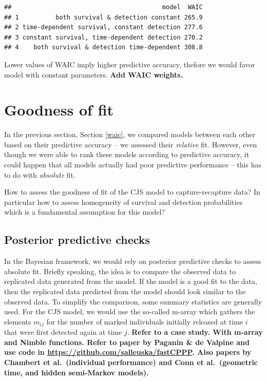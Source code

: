 \documentclass[
  12pt,
]{krantz}
\begin{document}
\begin{verbatim}
##                                         model  WAIC
## 1          both survival & detection constant 265.9
## 2 time-dependent survival, constant detection 277.6
## 3 constant survival, time-dependent detection 270.2
## 4    both survival & detection time-dependent 308.8
\end{verbatim}

Lower values of WAIC imply higher predictive accuracy, thefore we would favor model with constant parameters. \textbf{Add WAIC weights.}

\hypertarget{gof}{%
\section{Goodness of fit}\label{gof}}

In the previous section, Section \ref{waic}, we compared models between each other based on their predictive accuracy -- we assessed their \emph{relative} fit. However, even though we were able to rank these models according to predictive accuracy, it could happen that all models actually had poor predictive performance -- this has to do with \emph{absolute} fit.

How to assess the goodness of fit of the CJS model to capture-recapture data? In particular how to assess homogeneity of survival and detection probabilities which is a fundamental assumption for this model?

\hypertarget{posterior-predictive-checks}{%
\subsection{Posterior predictive checks}\label{posterior-predictive-checks}}

In the Bayesian framework, we would rely on posterior predictive checks to assess absolute fit. Briefly speaking, the idea is to compare the observed data to replicated data generated from the model. If the model is a good fit to the data, then the replicated data predicted from the model should look similar to the observed data. To simplify the comparison, some summary statistics are generally used. For the CJS model, we would use the so-called m-array which gathers the elements \(m_{ij}\) for the number of marked individuals initially released at time \(i\) that were first detected again at time \(j\). \textbf{Refer to a case study. With m-array and Nimble functions. Refer to paper by Paganin \& de Valpine and use code in \url{https://github.com/salleuska/fastCPPP}. Also papers by Chambert et al.~(individual performance) and Conn et al.~(geometric time, and hidden semi-Markov models).}
\end{document}
